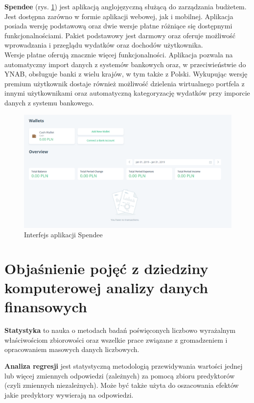 \textbf{Spendee} (rys. \ref{spendee_interfejs}) jest aplikacją anglojęzyczną służącą do zarządzania budżetem. Jest dostępna zarówno w formie aplikacji webowej, jak i mobilnej. Aplikacja posiada wersję podstawową oraz dwie wersje płatne różniące się dostępnymi funkcjonalnościami. Pakiet podstawowy jest darmowy oraz oferuje możliwość wprowadzania i przeglądu wydatków oraz dochodów użytkownika.\\
Wersje płatne oferują znacznie więcej funkcjonalności. Aplikacja pozwala na automatyczny import danych z systemów bankowych oraz, w przeciwieństwie do YNAB, obsługuje banki z wielu krajów, w tym także z Polski. Wykupując wersję premium użytkownik dostaje również możliwość dzielenia wirtualnego portfela z innymi użytkownikami oraz automatyczną kategoryzację wydatków przy imporcie danych z systemu bankowego.
\begin{figure}[!ht]
	\begin{center}
		\includegraphics[width=6in]{img/aplikacje/spendee_interfejs.png}
		\caption{Interfejs aplikacji Spendee}
		\label{spendee_interfejs}
	\end{center}
\end{figure}

\section{Objaśnienie pojęć z dziedziny komputerowej analizy danych finansowych}
\textbf{Statystyka} to nauka o metodach badań poświęconych liczbowo wyrażalnym właściwościom zbiorowości oraz wszelkie prace związane z gromadzeniem i opracowaniem masowych danych liczbowych.\cite{bptstatystyka}

\textbf{Analiza regresji} jest statystyczną metodologią przewidywania wartości jednej lub więcej zmiennych odpowiedzi (zależnych) za pomocą zbioru predyktorów (czyli zmiennych niezależnych). Może być także użyta do oszacowania efektów jakie predyktory wywierają na odpowiedzi.\cite{wielowymiarowymodelregresjiliniowej2014}

